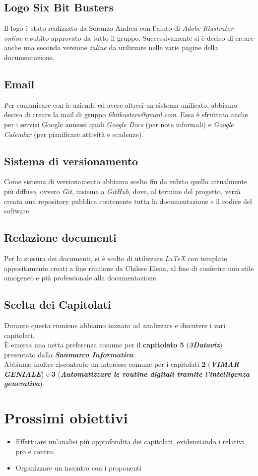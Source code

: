 \subsection{Logo Six Bit Busters}
    Il logo è stato realizzato da Soranzo Andrea con l'aiuto di \textit{Adobe Illustrator online} e subito approvato da tutto il gruppo. Successivamente si è deciso di creare anche una seconda versione \textit{inline} da utilizzare nelle varie pagine della documentazione. 
\subsection{Email}
    Per comunicare con le aziende ed avere altresì un sistema unificato, abbiamo deciso di creare la mail di gruppo \textit{6bitbusters@gmail.com}. Essa è sfruttata anche per i servizi Google annessi quali \textit{Google Docs} (per note informali) e \textit{Google Calendar} (per pianificare attività e scadenze).
\subsection{Sistema di versionamento}
    Come sistema di versionamento abbiamo scelto fin da subito quello attualmente più diffuso, ovvero \textit{Git}, insieme a \textit{GitHub}, dove, al termine del progetto, verrà creata una repository pubblica contenente tutta la documentazione e il codice del software.
\subsection{Redazione documenti}
    Per la stesura dei documenti, si è scelto di utilizzare \textit{LaTeX} con template appositamente creati a fine riunione da Chilese Elena, al fine di conferire uno stile omogeneo e più professionale alla documentazione.
\subsection{Scelta dei Capitolati}
    Durante questa riunione abbiamo iniziato ad analizzare e discutere i vari capitolati. \\È emersa una netta preferenza comune per il \textbf{capitolato 5} (\textit{\textbf{3Dataviz}}) presentato dalla \textit{\textbf{Sanmarco Informatica}}. \\Abbiamo inoltre riscontrato un interesse comune per i capitolati \textbf{2} (\textit{\textbf{VIMAR GENIALE}}) e \textbf{3} (\textit{\textbf{Automatizzare le routine digitali tramite l’intelligenza generativa}}).
\section{Prossimi obiettivi}
    \begin{itemize}
        \item Effettuare un’analisi più approfondita dei capitolati, evidenziando i relativi pro e contro.
        \item Organizzare un incontro con i proponenti
    \end{itemize}
